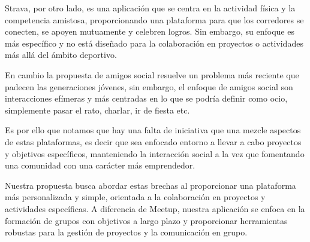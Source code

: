 Strava, por otro lado, es una aplicación que se centra en la
actividad física y la competencia amistosa, proporcionando una
plataforma para que los corredores se conecten, se apoyen
mutuamente y celebren logros. Sin embargo, su enfoque es
más específico y no está diseñado para la colaboración en
proyectos o actividades más allá del ámbito deportivo.

En cambio la propuesta de amigos social resuelve un problema más reciente que padecen las generaciones jóvenes, 
sin embargo, el enfoque de amigos social son interacciones efímeras y más centradas en lo que se podría definir como ocio,
simplemente pasar el rato, charlar, ir de fiesta etc.

Es por ello que notamos que hay una falta de iniciativa que una mezcle aspectos de estas plataformas, es decir que sea enfocado entorno a llevar a cabo proyectos y objetivos específicos, manteniendo la interacción
 social a la vez que fomentando una comunidad con una carácter más emprendedor.

Nuestra propuesta busca abordar estas brechas al proporcionar una 
plataforma más personalizada y simple, orientada a la colaboración en proyectos y 
actividades específicas. A diferencia de Meetup, nuestra aplicación se 
enfoca en la formación de grupos con objetivos a largo plazo y proporcionar
herramientas robustas para la gestión de proyectos y la comunicación en grupo.